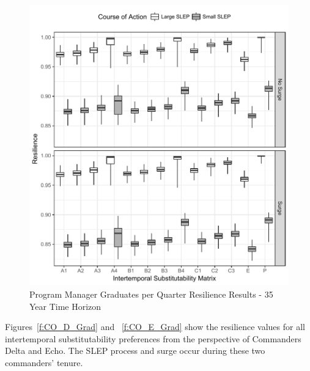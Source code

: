 \documentclass[preprint,12pt]{elsarticle}
\begin{document}
\begin{figure}[h]
  \centering\includegraphics{PMGradAllChiPlotTimeHorizon35}
  \caption{Program Manager Graduates per Quarter Resilience Results - 35 Year Time Horizon}
  \label{f:PMresultsGradAllChi35}
\end{figure}

Figures~\ref{f:CO_D_Grad} and ~\ref{f:CO_E_Grad} show
the resilience values for all intertemporal substitutability
preferences from the perspective of Commanders Delta and 
Echo. The SLEP process and surge occur during these two commanders'
tenure.
\end{document}
